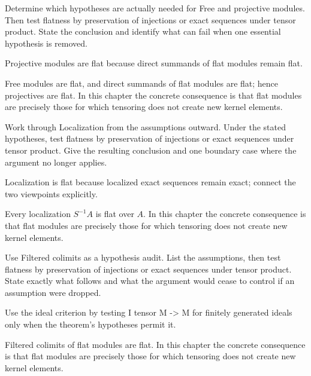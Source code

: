 \begin{exercise}\label{exr:v14-03}
Determine which hypotheses are actually needed for Free and projective modules. Then test flatness by preservation of injections or exact sequences under tensor product. State the conclusion and identify what can fail when one essential hypothesis is removed.
\end{exercise}
\begin{hint}
Projective modules are flat because direct summands of flat modules remain flat.
\end{hint}
\begin{solution}
Free modules are flat, and direct summands of flat modules are flat; hence projectives are flat. In this chapter the concrete consequence is that flat modules are precisely those for which tensoring does not create new kernel elements.
\end{solution}

\begin{exercise}\label{exr:v14-04}
Work through Localization from the assumptions outward. Under the stated hypotheses, test flatness by preservation of injections or exact sequences under tensor product. Give the resulting conclusion and one boundary case where the argument no longer applies.
\end{exercise}
\begin{hint}
Localization is flat because localized exact sequences remain exact; connect the two viewpoints explicitly.
\end{hint}
\begin{solution}
Every localization $S^{-1}A$ is flat over $A$. In this chapter the concrete consequence is that flat modules are precisely those for which tensoring does not create new kernel elements.
\end{solution}

\begin{exercise}\label{exr:v14-05}
Use Filtered colimits as a hypothesis audit. List the assumptions, then test flatness by preservation of injections or exact sequences under tensor product. State exactly what follows and what the argument would cease to control if an assumption were dropped.
\end{exercise}
\begin{hint}
Use the ideal criterion by testing I tensor M -> M for finitely generated ideals only when the theorem's hypotheses permit it.
\end{hint}
\begin{solution}
Filtered colimits of flat modules are flat. In this chapter the concrete consequence is that flat modules are precisely those for which tensoring does not create new kernel elements.
\end{solution}

